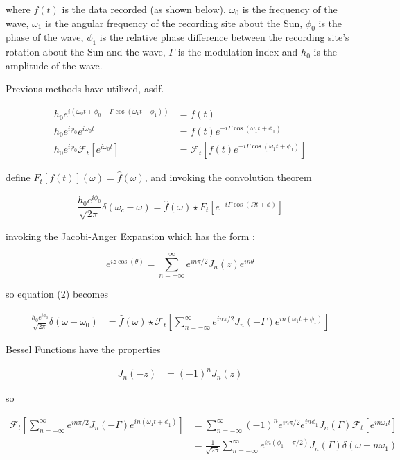 \documentclass[onecolumn, groupedaddress, 10pt]{revtex4-1}
\begin{document}
where $f(t)$ is the data recorded (as shown below), $\omega_0$ is the frequency of the wave, $\omega_1$ is the angular frequency of the recording site about the Sun, $\phi_0$ is the phase of the wave, $\phi_1$ is the relative phase difference between the recording site's rotation about the Sun and the wave, $\Gamma$ is the modulation index and $h_0$ is the amplitude of the wave.

Previous methods have utilized, asdf.

\begin{align}
h_0 e^{i\left( \omega_0 t + \phi_0 + \Gamma \cos (\omega_1 t + \phi_1 ) \right)} &= f(t) 												\\
h_0 e^{i\phi_0} e^{i\omega_0 t} &= f(t) e^{-i\Gamma \cos (\omega_1 t + \phi_1)}															\\
h_0 e^{i\phi_0} \mathcal{F}_t \left[ e^{i\omega_0 t} \right] &= \mathcal{F}_t \left[ f(t) e^{-i\Gamma \cos (\omega_1 t + \phi_1)} \right]
\end{align}

define $F_t[f(t)](\omega) = \hat{f}(\omega)$, and invoking the convolution theorem

\begin{equation}
\frac{h_0 e^{i\phi_0}}{\sqrt{2\pi}} \delta (\omega_c - \omega) = \hat{f}(\omega) \star F_t \left[ e^{-i\Gamma \cos (\Omega t + \phi)} \right]
\end{equation}

invoking the Jacobi-Anger Expansion which has the form \cite{}:

\begin{equation}
\label{eqn:jacobiAnger}
e^{iz\cos (\theta)} = \sum_{n=-\infty}^{\infty} e^{in\pi/2} J_n(z) e^{in\theta}
\end{equation}

so equation (2) becomes

\begin{align}
\frac{h_0 e^{i\phi_0}}{\sqrt{2\pi}} \delta (\omega - \omega_0)
&=
\hat{f}(\omega)
\star \mathcal{F}_t \left[ \sum_{n=-\infty}^{\infty} e^{in\pi/2} J_n(-\Gamma) e^{in(\omega_1 t + \phi_1)} \right]
\end{align}

Bessel Functions have the properties

\begin{align}
	J_n(-z) &= (-1)^n J_n(z)
\end{align}

so 

\begin{align}
\mathcal{F}_t \left[ \sum_{n=-\infty}^{\infty} e^{in\pi/2} J_n(-\Gamma) e^{in(\omega_1 t + \phi_1)} \right]
&= \sum_{n=-\infty}^{\infty} (-1)^n e^{in\pi/2} e^{in\phi_1} J_n(\Gamma) \mathcal{F}_t \left[e^{in\omega_1 t} \right]	 \\
&= \frac{1}{\sqrt{2\pi}}\sum_{n=-\infty}^{\infty} e^{in(\phi_1 - \pi/2)} J_n(\Gamma) \delta (\omega - n\omega_1)
\end{align}
\end{document}
